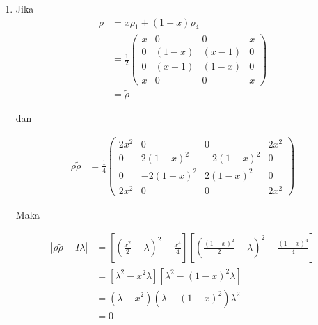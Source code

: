 \begin{enumerate}
	\begin{equation}
		\begin{aligned}
			\lambda_{1,2}
			&=(\frac{1}{2}-x+x^2)\pm\frac{2}{2}\sqrt{(\frac{1}{2}-x+x^2)^2-(x^2-2x^3+x^4)}\\
			&=(\frac{1}{2}-x+x^2)\pm\frac{2}{2}\sqrt{(\frac{1}{4}+x^2+x^4-x+x^2-2x^3)-(x^2-2x^3+x^4)}\\
			&=(\frac{1}{2}-x+x^2)\pm\frac{1}{2}\sqrt{1-4x+4x^2}\\
			&=(\frac{1}{2}-x+x^2)\pm\frac{1}{2}\sqrt{(1-2x)^2}\\
			&=(\frac{1}{2}-x+x^2)\pm(\frac{1}{2}-x)\\
			&=x^2; 1-2x+x^2\\
			&=x^2; (1-x)^2
		\end{aligned}
	\end{equation}
	
	sehingga $\lambda_1=x^2$, $\lambda_2=(1-x)^2$, dan $\lambda_3=\lambda_4=0$.
	
	\item Jika
	\begin{equation}
		\begin{aligned}
			\rho
			&=x\rho_1+(1-x)\rho_4\\
			&=\frac{1}{2}
			\begin{pmatrix}
				x&0&0&x\\
				0&(1-x)&(x-1)&0\\
				0&(x-1)&(1-x)&0\\
				x&0&0&x
			\end{pmatrix}\\
			&=\tilde{\rho}
		\end{aligned}
	\end{equation}
	
	dan
	
	\begin{equation}
		\begin{aligned}
			\rho \tilde{\rho}
			&=\frac{1}{4}
			\begin{pmatrix}
				2x^2&0&0&2x^2\\
				0&2(1-x)^2&-2(1-x)^2&0\\
				0&-2(1-x)^2&2(1-x)^2&0\\
				2x^2&0&0&2x^2
			\end{pmatrix}
		\end{aligned}
	\end{equation}
	
	Maka
	
	\begin{equation}
		\begin{aligned}
			|\rho \tilde{\rho}-I\lambda|
			&=[(\frac{x^2}{2}-\lambda)^2-\frac{x^4}{4}][(\frac{(1-x)^2}{2}-\lambda)^2-\frac{(1-x)^4}{4}]\\
			&=[\lambda^2-x^2\lambda][\lambda^2-(1-x)^2\lambda]\\
			&=(\lambda-x^2)(\lambda-(1-x)^2)\lambda^2\\
			&=0
		\end{aligned}
	\end{equation}
	

\end{enumerate}

